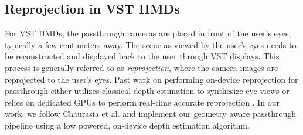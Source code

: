     \subsection{Reprojection in VST HMDs} For VST HMDs, the passthrough cameras are placed in front of the user's eyes, typically a few centimeters away.
    The scene as viewed by the user's eyes needs to be reconstructed and displayed back to the user through VST displays. This process is generally referred to as \emph{reprojection}, where the camera images are reprojected to the user's eyes. 
    Past work on performing on-device reprojection for passthrough either utilizes classical depth estimation to synthesize eye-views \cite{chaurasia2020passthroughplus} or relies on dedicated GPUs to perform real-time accurate reprojection \cite{novelviewsynthdevice, IBRreview, Lei2022Neuralpassthrough}. In our work, we follow Chaurasia et al. \cite{chaurasia2020passthroughplus}  and implement our geometry aware passthrough pipeline using a low powered, on-device depth estimation algorithm. 
